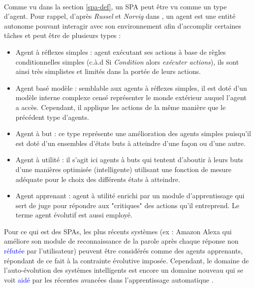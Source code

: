 \paragraph{}
Comme vu dans la section \ref{spa-def}, un SPA peut être vu comme un type d'agent. Pour rappel, d'après \textit{Russel} et \textit{Norvig} dans \cite{RussellAgent}, un agent\label{agent} est une entité autonome pouvant interagir avec son environnement afin d'accomplir certaines tâches et peut être de plusieurs types : 
\begin{itemize}
	\item Agent à réflexes simples : agent exécutant ses actions à base de règles conditionnelles simples (c.à.d Si \textit{Condition } alors \textit{exécuter actions}), ils sont ainsi très simplistes et limités dans la portée de leurs actions.
	
	\item Agent basé modèle : semblable aux agents à réflexes simples, il est doté d'un modèle interne complexe censé représenter le monde extérieur auquel l'agent a accès. Cependant, il applique les actions de la même manière que le précédent type d'agents.
	
	\item Agent à but : ce type représente une amélioration des agents simples puisqu'il est doté d'un ensembles d'états buts à atteindre d'une façon ou d'une autre.
	
	\item Agent à utilité : il s'agit ici agents à buts qui tentent d'aboutir à leurs buts d'une manières optimisée (intelligente) utilisant une fonction de mesure adéquate pour le choix des différents états à atteindre.
	
	\item Agent apprenant : agent à utilité enrichi par un module d'apprentissage qui sert de juge pour répondre aux "critiques" des actions qu'il entreprend. Le terme agent évolutif est aussi employé.
\end{itemize}
\par Pour ce qui est des SPAs, les plus récents systèmes (ex : Amazon Alexa qui améliore son  module de reconnaissance de la parole après chaque réponse non \textcolor{blue}{réfutée} par l'utilisateur) peuvent être considérés comme des agents apprenants, répondant de ce fait à la contrainte évolutive imposée. Cependant, le domaine de l'auto-évolution des systèmes intelligents est encore un domaine nouveau qui se voit \textcolor{blue}{aidé} par les récentes avancées dans l'apprentissage automatique \cite{SPA-overview}.


